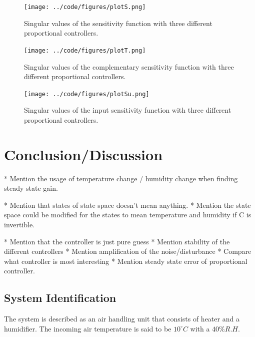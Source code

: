 \documentclass[a4paper, titlepage]{article}
\begin{document}
\begin{figure}[H]
\center
\texttt{[image: ../code/figures/plotS.png]}
\caption{Singular values of the sensitivity function with three different proportional controllers.}
\label{fig:plotS}
\end{figure}

\begin{figure}[H]
\center
\texttt{[image: ../code/figures/plotT.png]}
\caption{Singular values of the complementary sensitivity function with three different proportional controllers.}
\label{fig:plotT}
\end{figure}

\begin{figure}[H]
\center
\texttt{[image: ../code/figures/plotSu.png]}
\caption{Singular values of the input sensitivity function with three different proportional controllers.}
\label{fig:plotSu}
\end{figure}


\section{Conclusion/Discussion}
* Mention the usage of temperature change / humidity change when finding steady state gain.

* Mention that states of state space doesn't mean anything.
* Mention the state space could be modified for the states to mean temperature and humidity if C is invertible.

* Mention that the controller is just pure guess
* Mention stability of the different controllers
* Mention amplification of the noise/disturbance
* Compare what controller is most interesting
* Mention steady state error of proportional controller.

\subsection{System Identification}



The system is described as an air handling unit that consists of heater and a humidifier.
The incoming air temperature is said to be $10^\circ C$ with a $40\% R.H.$ 
\end{document}

